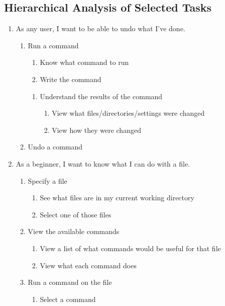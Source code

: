 \subsection{Hierarchical Analysis of Selected Tasks}
\begin{enumerate}
  \item As any user, I want to be able to undo what I've done.
  \begin{enumerate}
    \item Run a command
    \begin{enumerate}
      \item Know what command to run
      \item Write the command
    \end{enumerate}
    \begin{enumerate}
      \item Understand the results of the command
      \begin{enumerate}
        \item View what files/directories/settings were changed
        \item View how they were changed
      \end{enumerate}
    \end{enumerate}
    \item Undo a command
  \end{enumerate}

  \item As a beginner, I want to know what I can do with a file.
  \begin{enumerate}
    \item Specify a file
    \begin{enumerate}
      \item See what files are in my current working directory
      \item Select one of those files
    \end{enumerate}
    \item View the available commands
    \begin{enumerate}
      \item View a list of what commands would be useful for that file
      \item View what each command does
    \end{enumerate}
    \item Run a command on the file
    \begin{enumerate}
      \item Select a command
    \end{enumerate}
  \end{enumerate}


\end{enumerate}
